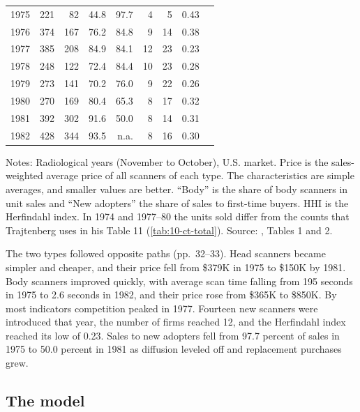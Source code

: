 \begin{table}[htbp]
\begin{tabular}{@{}lrrrrrrrr@{}}
1975 & 221 & 82 & 44.8 & 97.7 & 4 & 5 & 0.43 & \\
1976 & 374 & 167 & 76.2 & 84.8 & 9 & 14 & 0.38 & \\
1977 & 385 & 208 & 84.9 & 84.1 & 12 & 23 & 0.23 & \\
1978 & 248 & 122 & 72.4 & 84.4 & 10 & 23 & 0.28 & \\
1979 & 273 & 141 & 70.2 & 76.0 & 9 & 22 & 0.26 & \\
1980 & 270 & 169 & 80.4 & 65.3 & 8 & 17 & 0.32 & \\
1981 & 392 & 302 & 91.6 & 50.0 & 8 & 14 & 0.31 & \\
1982 & 428 & 344 & 93.5 & n.a. & 8 & 16 & 0.30 & \\
\bottomrule
\end{tabular}

\smallskip
\begin{minipage}{0.94\linewidth}
\footnotesize Notes: Radiological years (November to October), U.S. market. Price is the sales-weighted average
price of all scanners of each type. The characteristics are simple averages, and smaller values are better.
``Body'' is the share of body scanners in unit sales and ``New adopters'' the share of sales to first-time
buyers. HHI is the Herfindahl index. In 1974 and 1977--80 the units sold differ from the counts that Trajtenberg
uses in his Table 11 (\cref{tab:10-ct-total}). Source: \citet{Trajtenberg1985}, Tables 1 and 2.
\end{minipage}
\end{table}

The two types followed opposite paths (pp.~32--33). Head scanners became simpler and cheaper, and their price
fell from \$379K in 1975 to \$150K by 1981. Body scanners improved quickly, with average scan time
falling from 195 seconds in 1975 to 2.6 seconds in 1982, and their price rose from \$365K to \$850K. By most
indicators competition peaked in 1977. Fourteen new scanners were introduced that year, the number of firms
reached 12, and the Herfindahl index reached its low of 0.23. Sales to new adopters fell from 97.7 percent of
sales in 1975 to 50.0 percent in 1981 as diffusion leveled off and replacement purchases grew.

\subsection{The model}\label{sec:10-ct-model}

